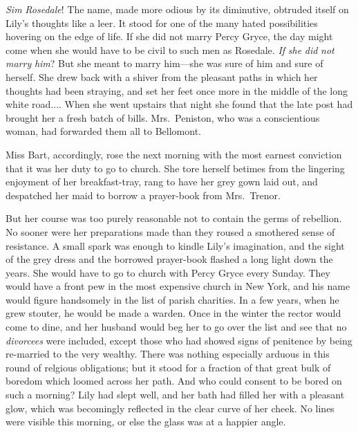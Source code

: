 \documentclass[12pt,a4paper]{book}
\begin{document}
\textit{Sim} \textit{Rosedale}! The name, made more odious by its diminutive,
obtruded itself on Lily's thoughts like a leer. It stood for one
of the many hated possibilities hovering on the edge of life. If
she did not marry Percy Gryce, the day might come when she would
have to be civil to such men as Rosedale. \textit{If} \textit{she} \textit{did} \textit{not} \textit{marry}
\textit{him}? But she meant to marry him---she was sure of him and sure of
herself. She drew back with a shiver from the pleasant paths in
which her thoughts had been straying, and set her feet once more
in the middle of the long white road.... When she went upstairs
that night she found that the late post had brought her a fresh
batch of bills. Mrs.\ Peniston, who was a conscientious woman, had
forwarded them all to Bellomont.





Miss Bart, accordingly, rose the next morning with the most
earnest conviction that it was her duty to go to church. She tore
herself betimes from the lingering enjoyment of her
breakfast-tray, rang to have her grey gown laid out, and
despatched her maid to borrow a prayer-book from Mrs.\ Trenor.





But her course was too purely reasonable not to contain the germs
of rebellion. No sooner were her preparations made than they
roused a smothered sense of resistance. A small spark was enough
to kindle Lily's imagination, and the sight of the grey dress and
the borrowed prayer-book flashed a long light down the years. She
would have to go to church with Percy Gryce every Sunday. They
would have a front pew in the most expensive church in New York,
and his name would figure handsomely in the list of parish
charities. In a few years, when he grew stouter, he would be made
a warden. Once in the winter the rector would come to dine, and
her husband would beg her to go over the list and see that no
\textit{divorcees} were included, except those who had showed signs of
penitence by being re-married to the very wealthy. There was
nothing especially arduous in this round of relgious
obligations; but it stood for a fraction of that great bulk of
boredom which loomed across her path. And who could consent to be
bored on such a morning? Lily had slept well, and her bath had
filled her with a pleasant glow, which was becomingly reflected
in the clear curve of her cheek. No lines were visible this
morning, or else the glass was at a happier angle.
\end{document}
